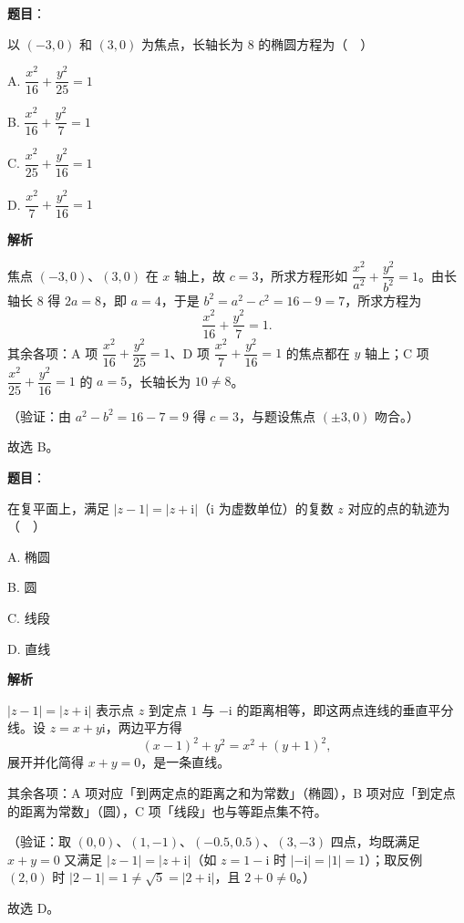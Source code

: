 \begin{answer}

\textbf{题目}：

以 \((-3,0)\) 和 \((3,0)\) 为焦点，长轴长为 8 的椭圆方程为（　）

A. \(\dfrac{x^{2}}{16}+\dfrac{y^{2}}{25}=1\)

B. \(\dfrac{x^{2}}{16}+\dfrac{y^{2}}{7}=1\)

C. \(\dfrac{x^{2}}{25}+\dfrac{y^{2}}{16}=1\)

D. \(\dfrac{x^{2}}{7}+\dfrac{y^{2}}{16}=1\)

\textbf{解析}

焦点 \((-3,0)\)、\((3,0)\) 在 \(x\) 轴上，故 \(c=3\)，所求方程形如 \(\dfrac{x^{2}}{a^{2}}+\dfrac{y^{2}}{b^{2}}=1\)。由长轴长 \(8\) 得 \(2a=8\)，即 \(a=4\)，于是 \(b^{2}=a^{2}-c^{2}=16-9=7\)，所求方程为
\nopagebreak[4]
\[
\frac{x^{2}}{16}+\frac{y^{2}}{7}=1.
\]
其余各项：A 项 \(\dfrac{x^{2}}{16}+\dfrac{y^{2}}{25}=1\)、D 项 \(\dfrac{x^{2}}{7}+\dfrac{y^{2}}{16}=1\) 的焦点都在 \(y\) 轴上；C 项 \(\dfrac{x^{2}}{25}+\dfrac{y^{2}}{16}=1\) 的 \(a=5\)，长轴长为 \(10\neq8\)。

（验证：由 \(a^{2}-b^{2}=16-7=9\) 得 \(c=3\)，与题设焦点 \((\pm3,0)\) 吻合。）

故选 B。


\end{answer}
\begin{answer}

\textbf{题目}：

在复平面上，满足 \(|z-1|=|z+\mathrm{i}|\)（\(\mathrm{i}\) 为虚数单位）的复数 \(z\) 对应的点的轨迹为（　）

A. 椭圆

B. 圆

C. 线段

D. 直线

\textbf{解析}

\(|z-1|=|z+\mathrm{i}|\) 表示点 \(z\) 到定点 \(1\) 与 \(-\mathrm{i}\) 的距离相等，即这两点连线的垂直平分线。设 \(z=x+y\mathrm{i}\)，两边平方得
\nopagebreak[4]
\[
(x-1)^{2}+y^{2}=x^{2}+(y+1)^{2},
\]
展开并化简得 \(x+y=0\)，是一条直线。

其余各项：A 项对应「到两定点的距离之和为常数」（椭圆），B 项对应「到定点的距离为常数」（圆），C 项「线段」也与等距点集不符。

（验证：取 \((0,0)\)、\((1,-1)\)、\((-0.5,0.5)\)、\((3,-3)\) 四点，均既满足 \(x+y=0\) 又满足 \(|z-1|=|z+\mathrm{i}|\)（如 \(z=1-\mathrm{i}\) 时 \(|-\mathrm{i}|=|1|=1\)）；取反例 \((2,0)\) 时 \(|2-1|=1\neq\sqrt{5}=|2+\mathrm{i}|\)，且 \(2+0\neq0\)。）

故选 D。


\end{answer}
